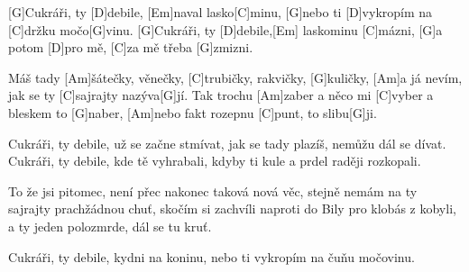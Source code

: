 
[G]Cukráři, ty [D]debile, [Em]naval lasko[C]minu,
[G]nebo ti [D]vykropím na [C]držku močo[G]vinu.
[G]Cukráři, ty [D]debile,[Em] laskominu [C]mázni,
[G]a potom [D]pro mě, [C]za mě třeba [G]zmizni.

Máš tady [Am]\null šátečky, věnečky, [C]trubičky,
rakvičky, [G]kuličky,
[Am]a já nevím, jak se ty [C]sajrajty nazýva[G]jí.
Tak trochu [Am]zaber a něco mi [C]vyber
a bleskem to [G]naber,
[Am]nebo fakt rozepnu [C]punt, to slibu[G]ji.

Cukráři, ty debile, už se začne stmívat,
jak se tady plazíš, nemůžu dál se dívat.
Cukráři, ty debile, kde tě vyhrabali,
kdyby ti kule a prdel raději rozkopali.

To že jsi pitomec, není přec nakonec
taková nová věc,
stejně nemám na ty sajrajty prachžádnou chuť,
skočím si zachvíli naproti do Bily
pro klobás z kobyli,
a ty jeden polozmrde, dál se tu kruť.

Cukráři, ty debile, kydni na koninu,
nebo ti vykropím na čuňu močovinu.
